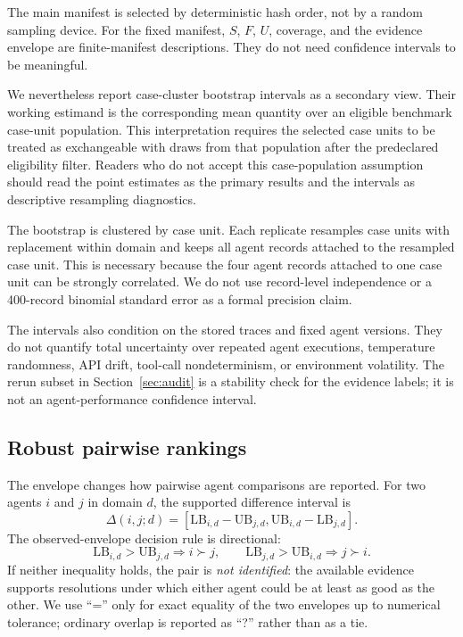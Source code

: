 \documentclass{article}
\begin{document}
The main manifest is selected by deterministic hash order, not by a random
sampling device. For the fixed manifest, \(S\), \(F\), \(U\), coverage, and the
evidence envelope are finite-manifest descriptions. They do not need confidence
intervals to be meaningful.

We nevertheless report case-cluster bootstrap intervals as a secondary view.
Their working estimand is the corresponding mean quantity over an eligible
benchmark case-unit population. This interpretation requires the selected case
units to be treated as exchangeable with draws from that population after the
predeclared eligibility filter. Readers who do not accept this
case-population assumption should read the point estimates as the primary
results and the intervals as descriptive resampling diagnostics.

The bootstrap is clustered by case unit. Each replicate resamples case units
with replacement within domain and keeps all agent records attached to the
resampled case unit. This is necessary because the four agent records attached
to one case unit can be strongly correlated. We do not use record-level
independence or a 400-record binomial standard error as a formal precision
claim.

The intervals also condition on the stored traces and fixed agent versions.
They do not quantify total uncertainty over repeated agent executions,
temperature randomness, API drift, tool-call nondeterminism, or environment
volatility. The rerun subset in Section~\ref{sec:audit} is a stability check
for the evidence labels; it is not an agent-performance confidence interval.

\subsection{Robust pairwise rankings}
\label{sec:pairwise}

The envelope changes how pairwise agent comparisons are reported. For two
agents \(i\) and \(j\) in domain \(d\), the supported difference interval is
\[
\Delta(i,j;d)=
\left[
\mathrm{LB}_{i,d}-\mathrm{UB}_{j,d},
\mathrm{UB}_{i,d}-\mathrm{LB}_{j,d}
\right].
\]
The observed-envelope decision rule is directional:
\[
\mathrm{LB}_{i,d}>\mathrm{UB}_{j,d}\Rightarrow i\succ j,
\qquad
\mathrm{LB}_{j,d}>\mathrm{UB}_{i,d}\Rightarrow j\succ i.
\]
If neither inequality holds, the pair is \emph{not identified}: the available
evidence supports resolutions under which either agent could be at least as
good as the other. We use ``='' only for exact equality of the two envelopes up
to numerical tolerance; ordinary overlap is reported as ``?'' rather than as a
tie.
\end{document}
